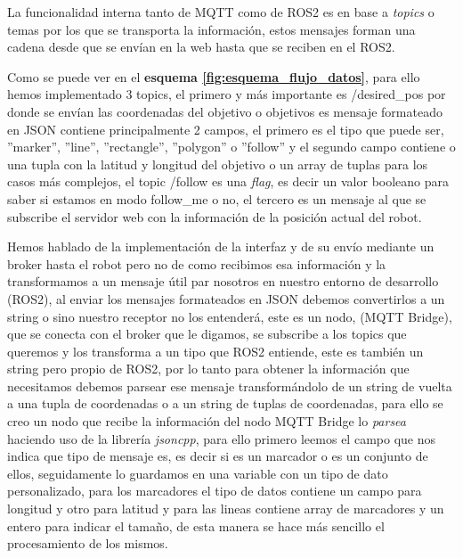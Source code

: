 \usetikzlibrary{arrows.meta, positioning}



La funcionalidad interna tanto de MQTT como de ROS2 es en base a \textit{topics} o temas por los que se transporta la información, estos 
mensajes forman una cadena desde que se envían en la web hasta que se reciben en el ROS2.

Como se puede ver en el \textbf{esquema \ref{fig:esquema_flujo_datos}}, para ello hemos implementado 3 topics, el primero y más importante 
es /desired\_pos por donde se envían las coordenadas del objetivo o objetivos es mensaje formateado en JSON contiene principalmente 2 
campos, el primero es el tipo que puede ser, ''marker'', ''line'', ''rectangle'', ''polygon'' o ''follow'' y el segundo campo contiene o 
una tupla con la latitud y longitud del objetivo o un array de tuplas para los casos más complejos, el topic /follow es una \textit{flag}, 
es decir un valor booleano para saber si estamos en modo follow\_me o no, el tercero es un mensaje al que se subscribe el servidor web con 
la información de la posición actual del robot.

Hemos hablado de la implementación de la interfaz y de su envío mediante un broker hasta el robot pero no de como recibimos esa información 
y la transformamos a un mensaje útil par nosotros en nuestro entorno de desarrollo (ROS2), al enviar los mensajes formateados en JSON 
debemos convertirlos a un string o sino nuestro receptor no los entenderá, este es un nodo, (MQTT Bridge), que se conecta con el broker 
que le digamos, se subscribe a los topics que queremos y los transforma a un tipo que ROS2 entiende, este es también un string pero propio 
de ROS2, por lo  tanto para obtener la información que necesitamos debemos parsear ese mensaje transformándolo de un string de vuelta a una 
tupla de coordenadas o a un string de tuplas de coordenadas, para ello se creo un nodo que recibe la información del nodo MQTT Bridge 
lo \textit{parsea} haciendo uso de la librería \textit{jsoncpp}, para ello primero leemos el campo que nos indica que tipo de mensaje es, es 
decir si es un marcador o es un conjunto de ellos, seguidamente lo guardamos en una variable con un tipo de dato personalizado, para los 
marcadores el tipo de datos contiene un campo para longitud y otro para latitud y para las lineas contiene array de marcadores y un entero 
para indicar el tamaño, de esta manera se hace más sencillo el procesamiento de los mismos.

